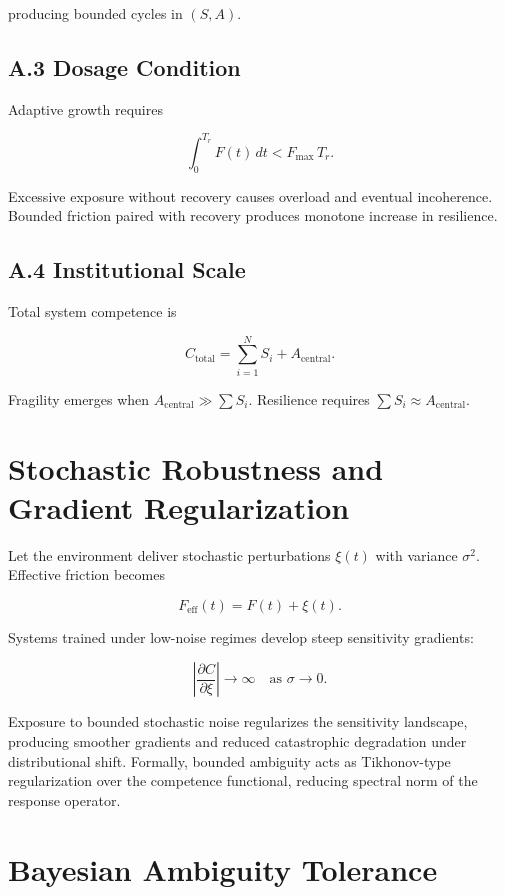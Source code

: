 \documentclass[11pt]{article}
\theoremstyle{remark}
\begin{document}
producing bounded cycles in $(S, A)$.

\subsection*{A.3 Dosage Condition}

Adaptive growth requires

\[
\int_0^{T_r} F(t)\,dt < F_{\max}\, T_r.
\]

Excessive exposure without recovery causes overload and eventual incoherence. Bounded friction paired with recovery produces monotone increase in resilience.

\subsection*{A.4 Institutional Scale}

Total system competence is

\[
C_{\text{total}} = \sum_{i=1}^N S_i + A_{\text{central}}.
\]

Fragility emerges when $A_{\text{central}} \gg \sum S_i$. Resilience requires $\sum S_i \approx A_{\text{central}}$.

\section{Stochastic Robustness and Gradient Regularization}
\label{app:stochastic}

Let the environment deliver stochastic perturbations $\xi(t)$ with variance $\sigma^2$. Effective friction becomes

\[
F_{\text{eff}}(t) = F(t) + \xi(t).
\]

Systems trained under low-noise regimes develop steep sensitivity gradients:

\[
\left|\frac{\partial C}{\partial \xi}\right| \to \infty \quad \text{as } \sigma \to 0.
\]

Exposure to bounded stochastic noise regularizes the sensitivity landscape, producing smoother gradients and reduced catastrophic degradation under distributional shift. Formally, bounded ambiguity acts as Tikhonov-type regularization over the competence functional, reducing spectral norm of the response operator.

\section{Bayesian Ambiguity Tolerance}
\label{app:bayesian}
\end{document}
